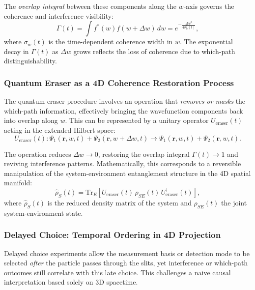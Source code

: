 \documentclass[12pt]{article}
\begin{document}
The \emph{overlap integral} between these components along the \(w\)-axis governs the coherence and interference visibility:
\begin{equation}
\Gamma(t) = \int f^*(w) f(w + \Delta w) \, dw = e^{-\frac{\Delta w^2}{4 \sigma_w^2(t)}},
\label{eq:overlap_coherence}
\end{equation}
where \(\sigma_w(t)\) is the time-dependent coherence width in \(w\). The exponential decay in \(\Gamma(t)\) as \(\Delta w\) grows reflects the loss of coherence due to which-path distinguishability.

\subsubsection*{Quantum Eraser as a 4D Coherence Restoration Process}

The quantum eraser procedure involves an operation that \emph{removes or masks} the which-path information, effectively bringing the wavefunction components back into overlap along \(w\). This can be represented by a unitary operator \(U_{\mathrm{eraser}}(t)\) acting in the extended Hilbert space:
\begin{equation}
U_{\mathrm{eraser}}(t): \Psi_1(\mathbf{r}, w, t) + \Psi_2(\mathbf{r}, w + \Delta w, t) \to \Psi_1(\mathbf{r}, w, t) + \Psi_2(\mathbf{r}, w, t).
\label{eq:unitary_eraser}
\end{equation}

The operation reduces \(\Delta w \to 0\), restoring the overlap integral \(\Gamma(t) \to 1\) and reviving interference patterns. Mathematically, this corresponds to a reversible manipulation of the system-environment entanglement structure in the 4D spatial manifold:
\begin{equation}
\hat{\rho}_S(t) = \mathrm{Tr}_E \left[ U_{\mathrm{eraser}}(t) \, \rho_{SE}(t) \, U_{\mathrm{eraser}}^\dagger(t) \right],
\label{eq:density_matrix_eraser}
\end{equation}
where \(\hat{\rho}_S(t)\) is the reduced density matrix of the system and \(\rho_{SE}(t)\) the joint system-environment state.

\subsubsection*{Delayed Choice: Temporal Ordering in 4D Projection}

Delayed choice experiments allow the measurement basis or detection mode to be selected \emph{after} the particle passes through the slits, yet interference or which-path outcomes still correlate with this late choice. This challenges a naive causal interpretation based solely on 3D spacetime.
\end{document}
